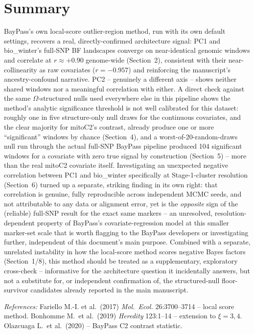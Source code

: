 \documentclass[11pt]{article}
\begin{document}
\section*{\color{Accent}Summary}
BayPass's own local-score outlier-region method, run with its own default settings, recovers
a real, directly-confirmed architecture signal: PC1 and bio\_winter's full-SNP BF landscapes
converge on near-identical genomic windows and correlate at $r\approx+0.90$ genome-wide
(Section~2), consistent with their near-collinearity as raw covariates ($r=-0.957$) and
reinforcing the manuscript's ancestry-confound narrative. PC2 -- genuinely a different axis
-- shows neither shared windows nor a meaningful correlation with either. A direct check
against the same $\Omega$-structured nulls used everywhere else in this pipeline shows the
method's analytic significance threshold is not well calibrated for this dataset: roughly one
in five structure-only null draws for the continuous covariates, and the clear majority for
mitoC2's contrast, already produce one or more ``significant'' windows by chance
(Section~4), and a worst-of-20-random-draws null run through the actual full-SNP BayPass
pipeline produced 104 significant windows for a covariate with zero true signal by
construction (Section~5) -- more than the real mitoC2 covariate itself. Investigating an
unexpected negative correlation between PC1 and bio\_winter specifically at Stage-1-cluster
resolution (Section~6) turned up a separate, striking finding in its own right: that
correlation is genuine, fully reproducible across independent MCMC seeds, and not
attributable to any data or alignment error, yet is the \emph{opposite} sign of the
(reliable) full-SNP result for the exact same markers -- an unresolved, resolution-dependent
property of BayPass's covariate-regression model at this smaller marker-set scale that is
worth flagging to the BayPass developers or investigating further, independent of this
document's main purpose. Combined with a separate, unrelated instability in how the local-score
method scores negative Bayes factors (Section~1/8), this method should be treated as a
supplementary, exploratory cross-check -- informative for the architecture question it
incidentally answers, but not a substitute for, or independent confirmation of, the
structured-null floor-survivor candidates already reported in the main manuscript.

\bigskip
{\small\color{Muted}
\textit{References:} Fariello M.-I. et al.\ (2017) \textit{Mol.\ Ecol.} 26:3700--3714 --
local score method. Bonhomme M.\ et al.\ (2019) \textit{Heredity} 123:1--14 -- extension to
$\xi=3,4$. Olazcuaga L.\ et al.\ (2020) -- BayPass C2 contrast statistic.}
\end{document}
